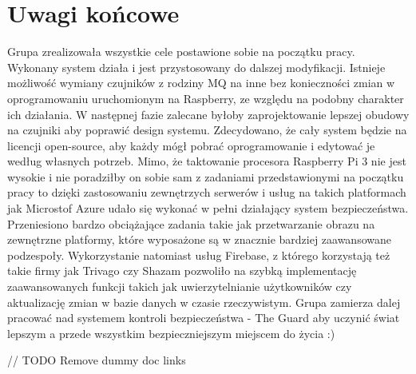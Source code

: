 \chapter{Uwagi końcowe}

Grupa zrealizowała wszystkie cele postawione sobie na początku pracy. Wykonany system działa i jest przystosowany do dalszej modyfikacji. Istnieje możliwość wymiany czujników z rodziny MQ na inne bez konieczności zmian w oprogramowaniu uruchomionym na Raspberry, ze względu na podobny charakter ich działania. W następnej fazie zalecane byłoby zaprojektowanie lepszej obudowy na czujniki aby poprawić design systemu. Zdecydowano, że cały system będzie na licencji open-source, aby każdy mógł pobrać oprogramowanie i edytować je według własnych potrzeb. Mimo, że taktowanie procesora Raspberry Pi 3 nie jest wysokie i nie poradziłby on sobie sam z zadaniami przedstawionymi na początku pracy to dzięki zastosowaniu zewnętrzych serwerów i usług na takich platformach jak Microstof Azure udało się wykonać w pełni działający system bezpieczeństwa. Przeniesiono bardzo obciążające zadania takie jak przetwarzanie obrazu na zewnętrzne platformy, które wyposażone są w znacznie bardziej zaawansowane podzespoły. Wykorzystanie natomiast usług Firebase, z którego korzystają też takie firmy jak Trivago czy Shazam pozwoliło na szybką implementację zaawansowanych funkcji takich jak uwierzytelnianie użytkowników czy aktualizację zmian w bazie danych w czasie rzeczywistym. Grupa zamierza dalej pracować nad systemem kontroli bezpieczeństwa - The Guard aby uczynić świat lepszym a przede wszystkim bezpieczniejszym miejscem do życia :)


// TODO Remove dummy doc links
\cite{MDESIGN}
\cite{RXJAVA}
\cite{KOTLIN}
\cite{RPI}
\cite{firebase}
\cite{android}
\cite{azure}
\cite{kotlin}